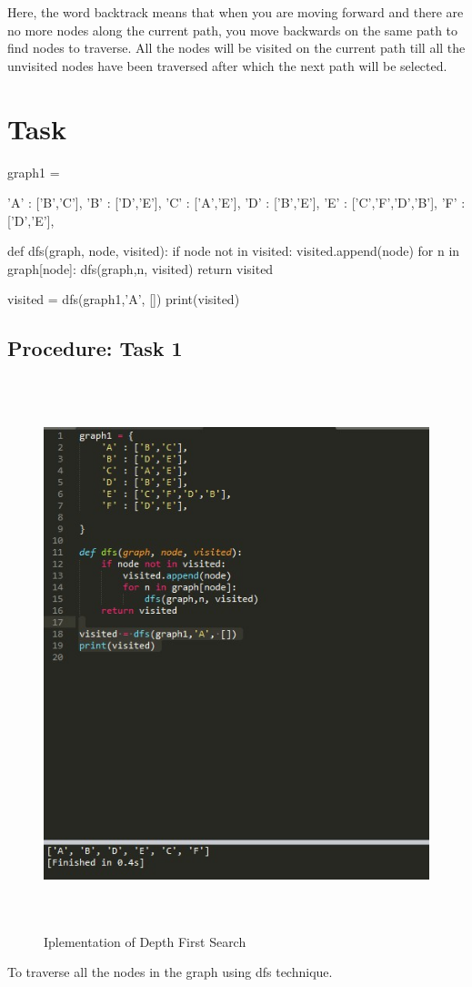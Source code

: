 \documentclass[11pt]{article}            %
\begin{document}
Here, the word backtrack means that when you are moving forward and there are no more nodes along the current path, you move backwards on the same path to find nodes to traverse. All the nodes will be visited on the current path till all the unvisited nodes have been traversed after which the next path will be selected.
\section{Task}  
graph1 = {
    'A' : ['B','C'],
    'B' : ['D','E'],
    'C' : ['A','E'],
    'D' : ['B','E'],
    'E' : ['C','F','D','B'],
    'F' : ['D','E'],
 
}

def dfs(graph, node, visited):
    if node not in visited:
        visited.append(node)
        for n in graph[node]:
            dfs(graph,n, visited)
    return visited

visited = dfs(graph1,'A', [])
print(visited)

\subsection{Procedure: Task 1 }     

\begin{figure}
\centering
  \includegraphics[width=35cm,height=16cm,keepaspectratio]{2.jpg}
\caption{Iplementation of Depth First Search}
\label{Figure:3}    
\end{figure}
To traverse all the nodes in the graph using dfs technique.
\end{document}
